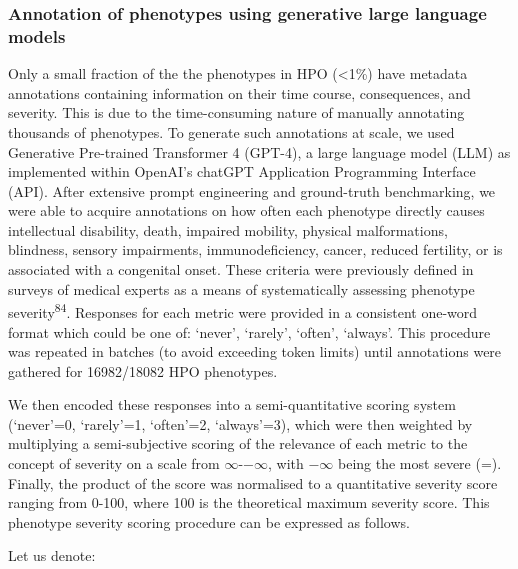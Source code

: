 \documentclass[
]{agujournal2019}
\begin{document}
\subsubsection{Annotation of phenotypes using generative large language
models}\label{annotation-of-phenotypes-using-generative-large-language-models-1}

Only a small fraction of the the phenotypes in HPO (\textless1\%) have
metadata annotations containing information on their time course,
consequences, and severity. This is due to the time-consuming nature of
manually annotating thousands of phenotypes. To generate such
annotations at scale, we used Generative Pre-trained Transformer 4
(GPT-4), a large language model (LLM) as implemented within OpenAI's
chatGPT Application Programming Interface (API). After extensive prompt
engineering and ground-truth benchmarking, we were able to acquire
annotations on how often each phenotype directly causes intellectual
disability, death, impaired mobility, physical malformations, blindness,
sensory impairments, immunodeficiency, cancer, reduced fertility, or is
associated with a congenital onset. These criteria were previously
defined in surveys of medical experts as a means of systematically
assessing phenotype severity\textsuperscript{84}. Responses for each
metric were provided in a consistent one-word format which could be one
of: `never', `rarely', `often', `always'. This procedure was repeated in
batches (to avoid exceeding token limits) until annotations were
gathered for 16982/18082 HPO phenotypes.

We then encoded these responses into a semi-quantitative scoring system
(`never'=0, `rarely'=1, `often'=2, `always'=3), which were then weighted
by multiplying a semi-subjective scoring of the relevance of each metric
to the concept of severity on a scale from
\ensuremath{\infty{}}-\ensuremath{-\infty{}}, with
\ensuremath{-\infty{}} being the most severe (=). Finally, the product
of the score was normalised to a quantitative severity score ranging
from 0-100, where 100 is the theoretical maximum severity score. This
phenotype severity scoring procedure can be expressed as follows.

Let us denote:
\end{document}
